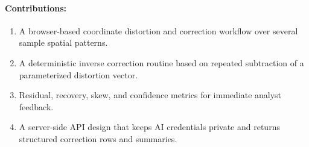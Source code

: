 \documentclass{article}
\begin{document}
\paragraph{Contributions:}
\begin{enumerate}
  \item A browser-based coordinate distortion and correction workflow over several sample spatial patterns.
  \item A deterministic inverse correction routine based on repeated subtraction of a parameterized distortion vector.
  \item Residual, recovery, skew, and confidence metrics for immediate analyst feedback.
  \item A server-side API design that keeps AI credentials private and returns structured correction rows and summaries.
\end{enumerate}
\end{document}
